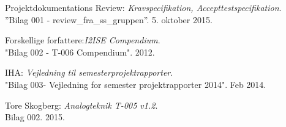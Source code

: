 	\fancyhead[CE,CO]{}
\renewcommand{\bibname}{Litteraturliste}
\begin{thebibliography}{2}

 Projektdokumentations Review: \textit{Kravspecifikation, Accepttestspecifikation}.\\
''Bilag 001 - review\_fra\_ss\_gruppen''. 5. oktober 2015.

 Forskellige forfattere:\textit{I2ISE Compendium}. \\
"Bilag 002 - T-006 Compendium". 2012.

 IHA: \textit{Vejledning til semesterprojektrapporter}. \\
"Bilag 003- Vejledning for semester projektrapporter 2014". Feb 2014.

 Tore Skogberg: \textit{Analogteknik T-005 v1.2}.\\
Bilag 002. 2015.

\end{thebibliography}